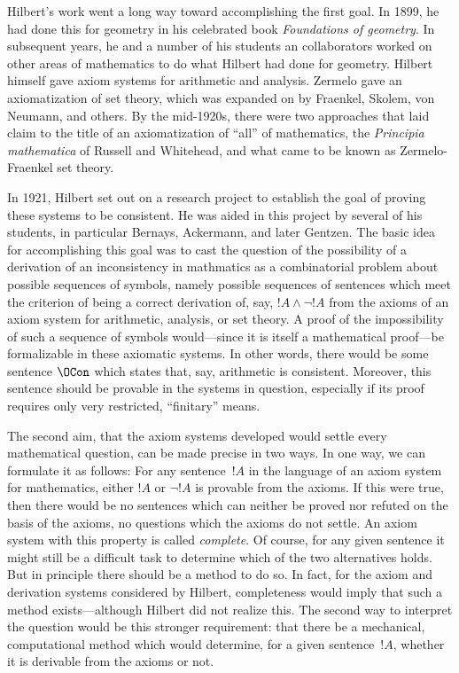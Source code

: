 \documentclass[../../../include/open-logic-section]{subfiles}
\begin{document}
Hilbert's work went a long way toward accomplishing the first goal.
In 1899, he had done this for geometry in his celebrated book
\emph{Foundations of geometry}. In subsequent years, he and a number
of his students an collaborators worked on other areas of mathematics
to do what Hilbert had done for geometry.  Hilbert himself gave axiom
systems for arithmetic and analysis. Zermelo gave an axiomatization of
set theory, which was expanded on by Fraenkel, Skolem, von Neumann,
and others.  By the mid-1920s, there were two approaches that laid
claim to the title of an axiomatization of ``all'' of mathematics, the
\emph{Principia mathematica} of Russell and Whitehead, and what came to
be known as Zermelo-Fraenkel set theory.

In 1921, Hilbert set out on a research project to establish the goal
of proving these systems to be consistent.  He was aided in this
project by several of his students, in particular Bernays, Ackermann,
and later Gentzen. The basic idea for accomplishing this goal was to
cast the question of the possibility of a derivation of an
inconsistency in mathmatics as a combinatorial problem about possible
sequences of symbols, namely possible sequences of sentences which
meet the criterion of being a correct derivation of, say, $!A \land
\lnot !A$ from the axioms of an axiom system for arithmetic, analysis,
or set theory.  A proof of the impossibility of such a sequence of
symbols would---since it is itself a mathematical proof---be
formalizable in these axiomatic systems.  In other words, there would
be some sentence $\OCon$ which states that, say, arithmetic is
consistent.  Moreover, this sentence should be provable in the systems
in question, especially if its proof requires only very restricted,
``finitary'' means.

The second aim, that the axiom systems developed would settle every
mathematical question, can be made precise in two ways. In one way, we
can formulate it as follows: For any sentence~$!A$ in the language of
an axiom system for mathematics, either $!A$ or $\lnot !A$ is provable
from the axioms.  If this were true, then there would be no sentences
which can neither be proved nor refuted on the basis of the axioms, no
questions which the axioms do not settle.  An axiom system with this
property is called \emph{complete}. Of course, for any given sentence
it might still be a difficult task to determine which of the two
alternatives holds.  But in principle there should be a method to do
so.  In fact, for the axiom and derivation systems considered by
Hilbert, completeness would imply that such a method exists---although
Hilbert did not realize this.  The second way to interpret the
question would be this stronger requirement: that there be a
mechanical, computational method which would determine, for a given
sentence~$!A$, whether it is derivable from the axioms or not.
\end{document}
